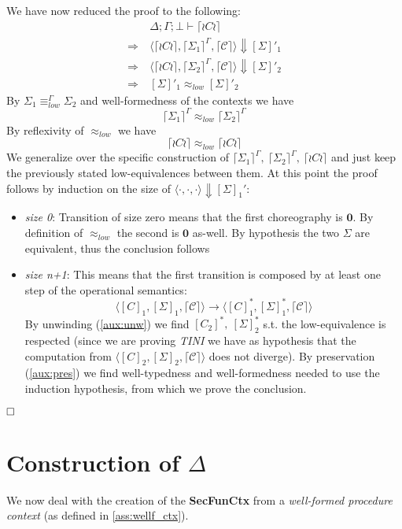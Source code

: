 \documentclass[12pt,a4paper,twoside]{book}
\newcommand{\qed}{\hfill\square}
\begin{document}
\bigskip
\noindent We have now reduced the proof to the following:
\begin{align*}
	&\Delta;\Gamma;\bot \vdash \lceil \wr C \wr \rceil \\
	\Rightarrow\ &\langle \lceil \wr C \wr \rceil, \lceil \Sigma_1 \rceil^\Gamma, \lceil \mathscr{C} \rceil\rangle \Downarrow [\Sigma]'_1 \\
	\Rightarrow\ &\langle \lceil \wr C \wr \rceil, \lceil \Sigma_2 \rceil^\Gamma, \lceil \mathscr{C} \rceil\rangle \Downarrow [\Sigma]'_2 \\
	\Rightarrow\ &[\Sigma]'_1 \approx_{low} [\Sigma]'_2
\end{align*}
By $\Sigma_1 \equiv^\Gamma_{low} \Sigma_2$ and well-formedness of the contexts we have
$$
\lceil \Sigma_1 \rceil^\Gamma \approx_{low} \lceil \Sigma_2 \rceil^\Gamma
$$
By reflexivity of $\approx_{low}$ we have
$$
\lceil \wr C \wr \rceil \approx_{low} \lceil \wr C \wr \rceil
$$
We generalize over the specific construction of
$ \lceil \Sigma_1 \rceil^\Gamma,~\lceil \Sigma_2 \rceil^\Gamma,~\lceil \wr C \wr \rceil $ and just keep the previously stated low-equivalences between them.
At this point the proof follows by induction on the size of $\langle \cdot, \cdot, \cdot\rangle \Downarrow [\Sigma]_1'$:
\begin{itemize}
	\item \emph{size 0}: Transition of size zero means that the first choreography is $\boldsymbol{0}$. By definition of $\approx_{low}$ the second is $\boldsymbol{0}$ as-well. By hypothesis the two $\Sigma$ are equivalent, thus the conclusion follows
	\item \emph{size n+1}: This means that the first transition is composed by at least one step of the operational semantics:
$$
		\langle [C]_1, [\Sigma]_1, \lceil\mathscr{C}\rceil\rangle \rightarrow
		\langle [C]_1^*, [\Sigma]_1^*, \lceil\mathscr{C}\rceil\rangle
$$
		By unwinding (\ref{aux:unw}) we find $[C_2]^*,~[\Sigma]_2^*$ s.t. the low-equivalence is respected (since we are proving \emph{TINI} we have as hypothesis that the computation from $\langle [C]_2, [\Sigma]_2, \lceil\mathscr{C}\rceil\rangle$ does not diverge).
		By preservation (\ref{aux:pres}) we find well-typedness and well-formedness needed to use the induction hypothesis, from which we prove the conclusion.
\end{itemize}
$\qed$

\chapter{Construction of $\Delta$}\label{chap:delta}
We now deal with the creation of the \textbf{SecFunCtx} from a \emph{well-formed procedure context} (as defined in \ref{ass:wellf_ctx}).
\end{document}
